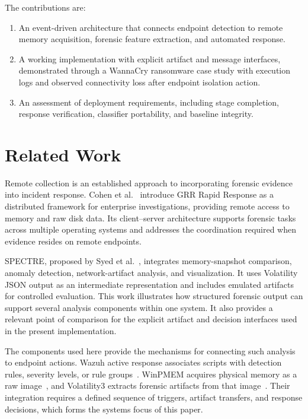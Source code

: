\documentclass[conference]{IEEEtran}
\begin{document}
The contributions are:
\begin{enumerate}
\item An event-driven architecture that connects endpoint detection to remote memory acquisition, forensic feature extraction, and automated response. 
\item A working implementation with explicit artifact and message interfaces, demonstrated through a WannaCry ransomware case study with execution logs and observed connectivity loss after endpoint isolation action.
\item An assessment of deployment requirements, including stage completion, response verification, classifier portability, and baseline integrity.
\end{enumerate}

\section{Related Work}

Remote collection is an established approach to incorporating forensic
evidence into incident response. Cohen et al.~\cite{cohen2011} introduce
GRR Rapid Response as a distributed framework for enterprise investigations,
providing remote access to memory and raw disk data. Its client--server
architecture supports forensic tasks across multiple operating systems and
addresses the coordination required when evidence resides on remote endpoints.

SPECTRE, proposed by Syed et al.~\cite{syed2026}, integrates memory-snapshot
comparison, anomaly detection, network-artifact analysis, and visualization.
It uses Volatility JSON output as an intermediate representation and includes
emulated artifacts for controlled evaluation. This work illustrates how
structured forensic output can support several analysis components within
one system. It also provides a relevant point of comparison for the explicit
artifact and decision interfaces used in the present implementation.

The components used here provide the mechanisms for connecting such analysis
to endpoint actions. Wazuh active response associates scripts with detection
rules, severity levels, or rule groups~\cite{wazuh}. WinPMEM acquires physical
memory as a raw image~\cite{winpmem}, and Volatility3 extracts forensic
artifacts from that image~\cite{volatility}. Their integration requires a
defined sequence of triggers, artifact transfers, and response decisions,
which forms the systems focus of this paper.
\end{document}

